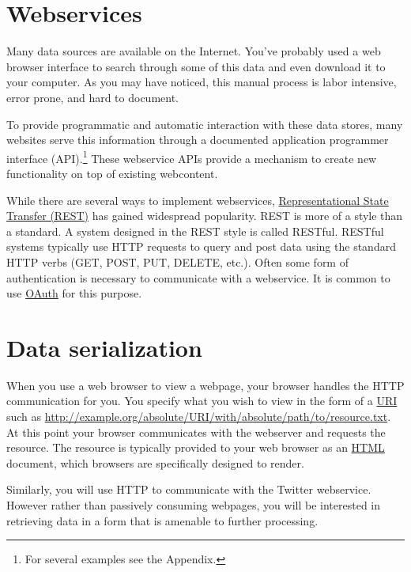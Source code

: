 \section{Webservices}

Many data sources are available on the Internet.  You've probably used
a web browser interface to search through some of this data and even
download it to your computer.  As you may have noticed, this manual
process is labor intensive, error prone, and hard to document.

To provide programmatic and automatic interaction with these data stores, many
websites serve this information through a documented application programmer
interface (API).\footnote{For several examples see the Appendix.}  These
webservice APIs provide a mechanism to create new functionality on top
of existing webcontent.

While there are several ways to implement webservices,
\href{http://en.wikipedia.org/wiki/Representational_state_transfer}{Representational
State Transfer (REST)} has gained widespread popularity.  REST is more of a
style than a standard.  A system designed in the REST style is called RESTful.
RESTful systems typically use HTTP requests to query and post data using the
standard HTTP verbs (GET, POST, PUT, DELETE, etc.).  Often some form of
authentication is necessary to communicate with a webservice.  It is common to
use \href{http://en.wikipedia.org/wiki/OAuth}{OAuth} for this purpose.

\section{Data serialization}

When you use a web browser to view a webpage, your browser handles the HTTP
communication for you.  You specify what you wish to view in the form of a
\href{http://en.wikipedia.org/wiki/Uniform_resource_identifier}{URI} such as
\url{http://example.org/absolute/URI/with/absolute/path/to/resource.txt}.  At
this point your browser communicates with the webserver and requests the
resource.  The resource is typically provided to your web browser as an
\href{http://en.wikipedia.org/wiki/HTML}{HTML} document, which browsers are
specifically designed to render.

Similarly, you will use HTTP to communicate with the Twitter webservice.
However rather than passively consuming webpages, you will be interested in
retrieving data in a form that is amenable to further processing.

